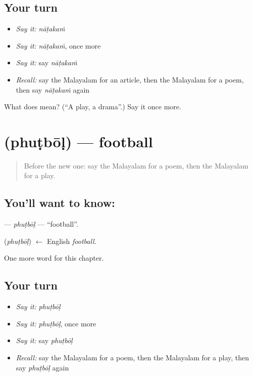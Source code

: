 \subsection*{Your turn}
\begin{itemize}
\raggedright
  \item \emph{Say it:} \emph{nāṭakaṁ}
  \item \emph{Say it:} \emph{nāṭakaṁ}, once more
  \item \emph{Say it:} say \emph{nāṭakaṁ}
  \item \emph{Recall:} say the Malayalam for an article, then the Malayalam for a poem, then say \emph{nāṭakaṁ} again
\end{itemize}

\begin{tcolorbox}[breakable,colback=teal!4,colframe=teal!35!black,title={Before you move on}]
What does  mean? (\textquotedblleft{}A play, a drama\textquotedblright{}.) Say it once more.
\end{tcolorbox}
\section[\texorpdfstring{\ml{ഫുട്ബോൾ} (phuṭbōḷ)}{ഫുട്ബോൾ (phuṭbōḷ)}]{ (phuṭbōḷ) — football}

\label{lesson:ML-C329-phutbol}



\begin{quote}
Before the new one: say the Malayalam for a poem, then the Malayalam for a play.
\end{quote}

\subsection*{You'll want to know: }
\textbf{} — \emph{phuṭbōḷ} — \textquotedblleft{}football\textquotedblright{}.

\begin{cousinweb}
\textbf{} (\emph{phuṭbōḷ}) $\leftarrow$ English \emph{football}.
\end{cousinweb}

\begin{grammarlens}[title={What you've built}]
One more word for this chapter.
\end{grammarlens}

\subsection*{Your turn}
\begin{itemize}
\raggedright
  \item \emph{Say it:} \emph{phuṭbōḷ}
  \item \emph{Say it:} \emph{phuṭbōḷ}, once more
  \item \emph{Say it:} say \emph{phuṭbōḷ}
  \item \emph{Recall:} say the Malayalam for a poem, then the Malayalam for a play, then say \emph{phuṭbōḷ} again
\end{itemize}

